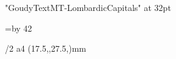 \fontfam[alcuin]

\font\Lombardic "GoudyTextMT-LombardicCapitals" at 32pt\relax

\typosize[12/14]

\vsize=\topskip \advance \vsize by 42\baselineskip

\parskip0pt
\parindent\baselineskip

\margins/2 a4 (17.5,,27.5,)mm

\newif\ifblue \bluetrue

\def\switchcolor{
	\ifblue
		\def\initialcolor{\Red}%
		\bluefalse
	\else
		\def\initialcolor{\Blue}%
		\bluetrue
	\fi
}


\def\initial#1{%
	\par\null\par
	\switchcolor
	\setbox0\hbox{\initialcolor\Lombardic #1}%
	\dimen0=5pt %
	\dimen1=3pt %
	\if #1E \dimen0=3pt\fi
	\if #1G \dimen0=3pt\fi
	\if #1I \dimen0=6pt\fi
	\if #1J \dimen0=8pt\fi
	\if #1K \dimen0=6pt\fi
	\if #1M \dimen0=8pt\fi
	\if #1N \dimen0=6pt\fi
	\if #1O \dimen0=3pt\fi
	\if #1P \dimen0=3.5pt\fi
	\if #1Q \dimen0=3pt\fi
	\if #1R \dimen0=6pt\fi
	\if #1U \dimen0=4pt\fi
	\if #1V \dimen0=7pt\fi
	\if #1W \dimen0=3pt\fi
	\if #1X \dimen0=3pt\fi
	\if #1Y \dimen0=7pt\fi
	\if #1Z \dimen0=2pt\fi
	\if #1Ö \dimen0=3pt\fi
	\dimen2=\dimexpr(\wd0-\dimen0+\dimen1)\relax %
	\dimen3=\dimexpr(\hsize-\dimen2)\relax %
	\ht0=0pt \dp0=0pt%
	\moveleft \dimen0 \box0
	\vskip-2\baselineskip
	\parshape 3 \dimen2 \dimen3 \dimen2 \dimen3 0pt \hsize
	\noindent
}


\it



